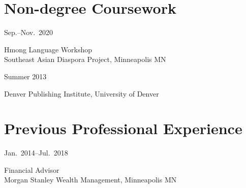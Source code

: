 \documentclass[11pt,oneside,DIV=calc,parskip=off]{scrarticle} %
\newlength{\leftcolwidth}
\newlength{\rightcolwidth}
\newlength{\spacingbefore}
\newlength{\spacingafter}
\newcommand{\mytwocol}[2]{%
	\vspace{\spacingbefore}%
	\begin{minipage}[t]{\leftcolwidth}%
		\strut#1%
	\end{minipage}%
	\begin{minipage}[t]{\rightcolwidth}%
		\strut#2%
	\end{minipage}%
	\vspace{\spacingafter}\par%
	}
\newcommand{\cvline}[2]{%
	\mytwocol{#1}{#2}%
	}
\begin{document}
\section{Non-degree Coursework}
\cvline{Sep.--Nov.\ 2020}{Hmong Language Workshop\\Southeast Asian Diaspora Project, Minneapolis MN}
\cvline{Summer 2013}{Denver Publishing Institute, University of Denver}

\section{Previous Professional Experience}
\cvline{Jan.\ 2014--Jul.\ 2018}{Financial Advisor\\Morgan Stanley Wealth Management, Minneapolis MN}


\end{document}
